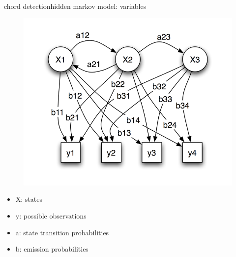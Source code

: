         \begin{frame}{chord detection}{hidden markov model: variables}
            \begin{figure}[t]
                \centering
                    \includegraphics[scale=.25]{graph/HiddenMarkovModel}
            \end{figure}
            \vspace{-5mm}
            \begin{footnotesize}
                \begin{itemize}
                    \item	X: states
                    \item	y: possible observations
                    \item	a: state transition probabilities
                    \item	b: emission probabilities
                \end{itemize}
            \end{footnotesize}
        \end{frame}
